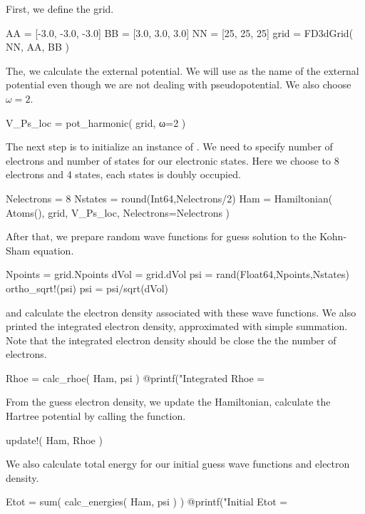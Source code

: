 First, we define the grid.
\begin{juliacode}
AA = [-3.0, -3.0, -3.0]
BB = [3.0, 3.0, 3.0]
NN = [25, 25, 25]
grid = FD3dGrid( NN, AA, BB )
\end{juliacode}

The, we calculate the external potential. We will use  as the name of
the external potential even though we are not dealing with pseudopotential.
We also choose $\omega=2$.
\begin{juliacode}
V_Ps_loc = pot_harmonic( grid, ω=2 )
\end{juliacode}

The next step is to initialize an instance of . We need to specify
number of electrons and number of states for our electronic states. Here we choose to 8
electrons and 4 states, each states is doubly occupied.
\begin{juliacode}
Nelectrons = 8
Nstates = round(Int64,Nelectrons/2)
Ham = Hamiltonian( Atoms(), grid, V_Ps_loc, Nelectrons=Nelectrons )
\end{juliacode}

After that, we prepare random wave functions for guess solution to the Kohn-Sham equation.
\begin{juliacode}
Npoints = grid.Npoints
dVol = grid.dVol
psi = rand(Float64,Npoints,Nstates)
ortho_sqrt!(psi)
psi = psi/sqrt(dVol)
\end{juliacode}
and calculate the electron density associated with these wave functions.
We also printed the integrated electron density, approximated with simple summation.
Note that the integrated electron density should be close the the number of electrons.
\begin{juliacode}
Rhoe = calc_rhoe( Ham, psi )
@printf("Integrated Rhoe = %
\end{juliacode}

From the guess electron density, we update the Hamiltonian, calculate the
Hartree potential by calling the  function.
\begin{juliacode}
update!( Ham, Rhoe )
\end{juliacode}

We also calculate total energy for our initial guess wave functions and electron
density.
\begin{juliacode}
Etot = sum( calc_energies( Ham, psi ) )
@printf("Initial Etot = %
\end{juliacode}

